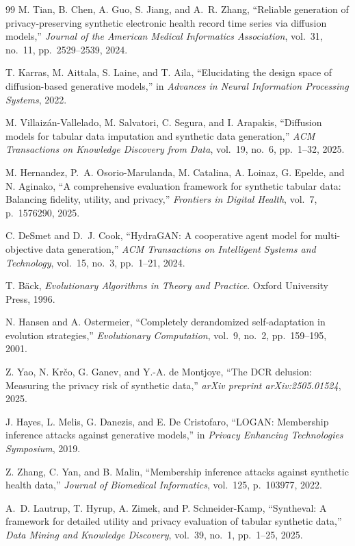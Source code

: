 \documentclass[preprint,12pt]{elsarticle}
\begin{document}
\begin{thebibliography}{99}
M. Tian, B. Chen, A. Guo, S. Jiang, and A.~R. Zhang,
``Reliable generation of privacy-preserving synthetic electronic health record time series via diffusion models,''
\emph{Journal of the American Medical Informatics Association}, vol.~31, no.~11, pp.~2529--2539, 2024.

T. Karras, M. Aittala, S. Laine, and T. Aila,
``Elucidating the design space of diffusion-based generative models,''
in \emph{Advances in Neural Information Processing Systems}, 2022.

M. Villaiz{\'a}n-Vallelado, M. Salvatori, C. Segura, and I. Arapakis,
``Diffusion models for tabular data imputation and synthetic data generation,''
\emph{ACM Transactions on Knowledge Discovery from Data}, vol.~19, no.~6, pp.~1--32, 2025.

M. Hernandez, P.~A. Osorio-Marulanda, M. Catalina, A. Loinaz, G. Epelde, and N. Aginako,
``A comprehensive evaluation framework for synthetic tabular data: Balancing fidelity, utility, and privacy,''
\emph{Frontiers in Digital Health}, vol.~7, p.~1576290, 2025.

C. DeSmet and D.~J. Cook,
``HydraGAN: A cooperative agent model for multi-objective data generation,''
\emph{ACM Transactions on Intelligent Systems and Technology}, vol.~15, no.~3, pp.~1--21, 2024.

T. B{\"a}ck,
\emph{Evolutionary Algorithms in Theory and Practice}.
Oxford University Press, 1996.

N. Hansen and A. Ostermeier,
``Completely derandomized self-adaptation in evolution strategies,''
\emph{Evolutionary Computation}, vol.~9, no.~2, pp.~159--195, 2001.

Z. Yao, N. Kr{\v c}o, G. Ganev, and Y.-A. de Montjoye,
``The DCR delusion: Measuring the privacy risk of synthetic data,''
\emph{arXiv preprint arXiv:2505.01524}, 2025.

J. Hayes, L. Melis, G. Danezis, and E. De Cristofaro,
``LOGAN: Membership inference attacks against generative models,''
in \emph{Privacy Enhancing Technologies Symposium}, 2019.

Z. Zhang, C. Yan, and B. Malin,
``Membership inference attacks against synthetic health data,''
\emph{Journal of Biomedical Informatics}, vol.~125, p.~103977, 2022.

A.~D. Lautrup, T. Hyrup, A. Zimek, and P. Schneider-Kamp,
``Syntheval: A framework for detailed utility and privacy evaluation of tabular synthetic data,''
\emph{Data Mining and Knowledge Discovery}, vol.~39, no.~1, pp.~1--25, 2025.


\end{thebibliography}
\end{document}
